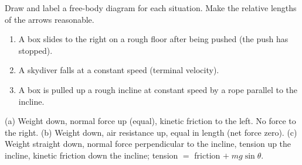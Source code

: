 \begin{exo}{}
Draw and label a free-body diagram for each situation. Make the relative lengths of the arrows reasonable.
\begin{enumerate}[label=(\alph*)]
\item A box slides to the right on a rough floor after being pushed (the push has stopped).
\item A skydiver falls at a constant speed (terminal velocity).
\item A box is pulled up a rough incline at constant speed by a rope parallel to the incline.
\end{enumerate}
\work{5.5cm}
\begin{solution}
(a) Weight down, normal force up (equal), kinetic friction to the left. No force to the right. \;(b) Weight down, air resistance up, equal in length (net force zero). \;(c) Weight straight down, normal force perpendicular to the incline, tension up the incline, kinetic friction down the incline; tension $=$ friction $+\;mg\sin\theta$.
\end{solution}
\end{exo}

